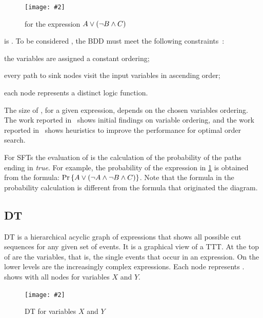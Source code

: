 \documentclass[12pt,openright,twoside,a4paper,oldfontcommands,english,brazil,final]{abntex2}
\theoremstyle{theo}
\newcommand{\includegraphicsaspectratio}[2][1]{%
  \texttt{[image: \#2]}%
}
\newcommand{\parsin}[1]{\ensuremath\left( #1 \right)}
\def\probabilityop{\ensuremath \Pr}
\newcommand{\probability}[1]{\ensuremath \probabilityop\left\{#1\right\}}
\begin{document}
\begin{figure}[htb]
  \centering
  \includegraphicsaspectratio[0.25]{bdd-diagram-for-example-expression}
  \caption{ for the expression $A \lor \parsin{\lnot B \land C}$}
  \label{fig:bdd-diagram-for-example-expression}
\end{figure}

 is .
To be considered , the \ac{BDD} must meet the following constraints~\cite{BRB1990}:
%
\begin{alineas}
  \item the variables are assigned a constant ordering;
  \item every path to sink nodes visit the input variables in ascending order;
  \item each node represents a distinct logic function.
\end{alineas}
%
The size of , for a given expression, depends on the chosen variables ordering.
The work reported in~\cite{Rudell1993} shows initial findings on variable ordering, and the work reported in~\cite{KH2014} shows heuristics to improve the performance for optimal order search.

For \acp{SFT} the evaluation of  is the calculation of the probability of the paths ending in \emph{true}.
For example, the probability of the expression in \cref{fig:bdd-diagram-for-example-expression} is obtained from the formula: $\probability{A \lor \parsin{\lnot A \land \lnot B \land C}}$. Note that the formula in the probability calculation is different from the formula that originated the diagram.

\subsection{\Acl*{DT}}
\label{sec:dependency-trees}

\Acf{DT} is a hierarchical acyclic graph of expressions that shows all possible cut sequences for any given set of events.
It is a graphical view of a \ac{TTT}.
At the top of  are the variables, that is, the single events that occur in an expression.
On the lower levels are the increasingly complex expressions.
Each node represents .
 shows  with all nodes for variables $X$ and $Y$.

\begin{figure}[htb]
  \centering
  \includegraphicsaspectratio[0.5]{simple-dependency-tree}
  \caption{\acs*{DT} for variables $X$ and $Y$}
  \label{fig:simple-dependency-tree}
\end{figure}
\end{document}

